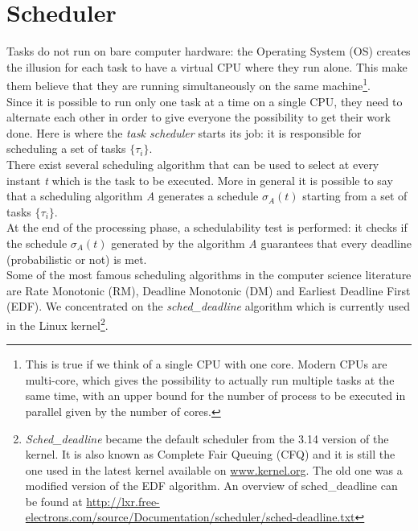 \section{Scheduler}
Tasks do not run on bare computer hardware: the Operating System (OS) creates the illusion for each task to have a virtual CPU where they run alone. This make them believe that they are running simultaneously on the same machine\footnote{This is true if we think of a single CPU with one core. Modern CPUs are multi-core, which gives the possibility to actually run multiple tasks at the same time, with an upper bound for the number of process to be executed in parallel given by the number of cores.}.\\
Since it is possible to run only one task at a time on a single CPU, they need to alternate each other in order to give everyone the possibility to get their work done. Here is where the \emph{task scheduler} starts its job: it is responsible for scheduling a set of tasks \( \{\tau_{i}\} \).\\
There exist several scheduling algorithm that can be used to select at every instant \emph{t} which is the task to be executed. More in general it is possible to say that a scheduling algorithm \emph{A} generates a schedule \( \sigma_{A}\left(t\right) \) starting from a set of tasks \( \{\tau_{i}\} \).\\
At the end of the processing phase, a schedulability test is performed: it checks if the schedule \( \sigma_{A}\left(t\right) \) generated by the algorithm \emph{A} guarantees that every deadline (probabilistic or not) is met.\\
Some of the most famous scheduling algorithms in the computer science literature are Rate Monotonic (RM), Deadline Monotonic (DM) and Earliest Deadline First (EDF). We concentrated on the \emph{sched\_deadline} algorithm which is currently used in the Linux kernel\footnote{\emph{Sched\_deadline} became the default scheduler from the 3.14 version of the kernel. It is also known as Complete Fair Queuing (CFQ) and it is still the one used in the latest kernel available on \url{www.kernel.org}. The old one was a modified version of the EDF algorithm. An overview of sched\_deadline can be found at \url{http://lxr.free-electrons.com/source/Documentation/scheduler/sched-deadline.txt}}.

